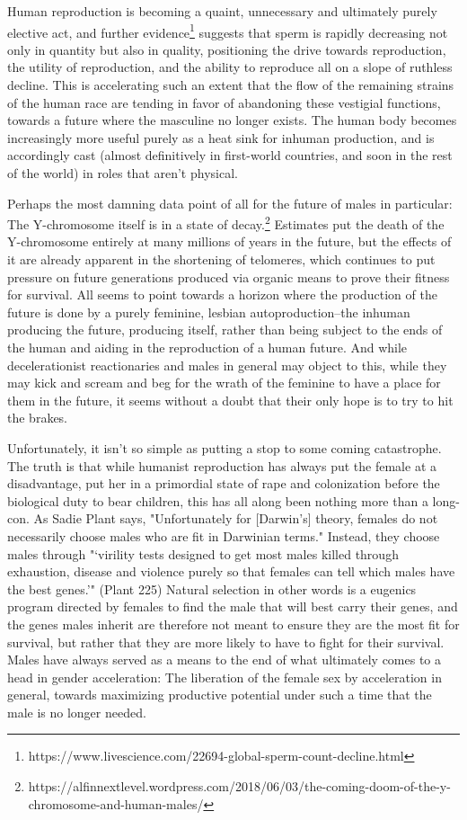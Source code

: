 \documentclass[12pt, a5paper, twoside, openright]{memoir}
\begin{document}
Human reproduction is becoming a quaint, unnecessary and ultimately purely elective act, and further evidence\footnote{https://www.livescience.com/22694-global-sperm-count-decline.html} suggests that sperm is rapidly decreasing not only in quantity but also in quality, positioning the drive towards reproduction, the utility of reproduction, and the ability to reproduce all on a slope of ruthless decline. This is accelerating such an extent that the flow of the remaining strains of the human race are tending in favor of abandoning these vestigial functions, towards a future where the masculine no longer exists. The human body becomes increasingly more useful purely as a heat sink for inhuman production, and is accordingly cast (almost definitively in first-world countries, and soon in the rest of the world) in roles that aren't physical.

Perhaps the most damning data point of all for the future of males in particular: The Y-chromosome itself is in a state of decay.\footnote{https://alfinnextlevel.wordpress.com/2018/06/03/the-coming-doom-of-the-y-chromosome-and-human-males/} Estimates put the death of the Y-chromosome entirely at many millions of years in the future, but the effects of it are already apparent in the shortening of telomeres, which continues to put pressure on future generations produced via organic means to prove their fitness for survival. All seems to point towards a horizon where the production of the future is done by a purely feminine, lesbian autoproduction--the inhuman producing the future, producing itself, rather than being subject to the ends of the human and aiding in the reproduction of a human future. And while decelerationist reactionaries and males in general may object to this, while they may kick and scream and beg for the wrath of the feminine to have a place for them in the future, it seems without a doubt that their only hope is to try to hit the brakes.

Unfortunately, it isn't so simple as putting a stop to some coming catastrophe. The truth is that while humanist reproduction has always put the female at a disadvantage, put her in a primordial state of rape and colonization before the biological duty to bear children, this has all along been nothing more than a long-con. As Sadie Plant says, "Unfortunately for [Darwin's] theory, females do not necessarily choose males who are fit in Darwinian terms." Instead, they choose males through "‘virility tests designed to get most males killed through exhaustion, disease and violence purely so that females can tell which males have the best genes.'" (Plant 225) Natural selection in other words is a eugenics program directed by females to find the male that will best carry their genes, and the genes males inherit are therefore not meant to ensure they are the most fit for survival, but rather that they are more likely to have to fight for their survival. Males have always served as a means to the end of what ultimately comes to a head in gender acceleration: The liberation of the female sex by acceleration in general, towards maximizing productive potential under such a time that the male is no longer needed.
\end{document}
